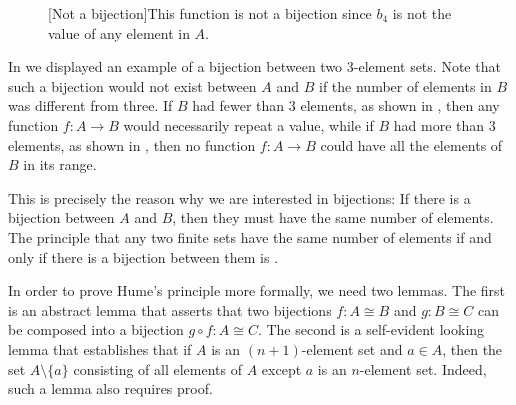 \begin{figure}[t]
\begin{minipage}[t]{.45\textwidth}
%
    [Not a bijection]{This function is not a bijection since $b_4$ is not the value of any element in $A$.}%
    \label{figure:not-bijection-2}%
  \end{minipage}
\end{figure}
In  we displayed an example of a bijection between two $3$-element sets.
Note that such a bijection would not exist between $A$ and $B$ if the number of elements in $B$ was different from three.
If $B$ had fewer than $3$ elements, as shown in ,
then any function $f:A\to B$ would necessarily repeat a value,
while if $B$ had more than $3$ elements,
as shown in ,
then no function $f:A\to B$ could have all the elements of $B$ in its range.

This is precisely the reason why we are interested in bijections:
If there is a bijection between $A$ and $B$,
then they must have the same number of elements.
The principle that any two finite sets have the same number of elements if and only if there is a bijection between them is .

In order to prove Hume's principle more formally,
we need two lemmas.
The first is an abstract lemma that asserts that two bijections $f:A\cong B$ and $g:B\cong C$ can be composed into a bijection $g\circ f:A\cong C$.
The second is a self-evident looking lemma that establishes that if $A$ is an $(n+1)$-element set and $a\in A$,
then the set $A\setminus\{a\}$ consisting of all elements of $A$ except $a$ is an $n$-element set.
Indeed, such a lemma also requires proof.

